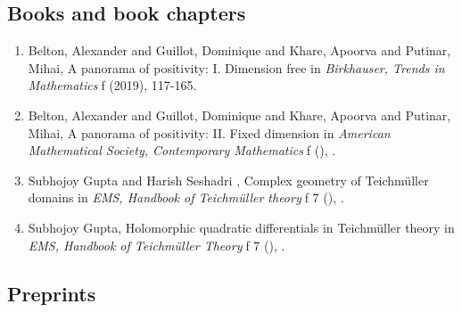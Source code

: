 \subsection{Books and book chapters}

\begin{enumerate}
\item Belton, Alexander and Guillot, Dominique and Khare, Apoorva and Putinar, Mihai, A panorama of positivity: I. Dimension free in {\em Birkhauser, Trends in Mathematics}{f } (2019), 117-165.
\item Belton, Alexander and Guillot, Dominique and Khare, Apoorva and Putinar, Mihai, A panorama of positivity: II. Fixed dimension in {\em American Mathematical Society, Contemporary Mathematics}{f } (), .
\item Subhojoy Gupta and Harish Seshadri , Complex geometry of Teichmüller domains in {\em EMS, Handbook of Teichmüller theory}{f 7} (), .
\item Subhojoy Gupta, Holomorphic quadratic differentials in Teichmüller theory in {\em EMS, Handbook of Teichmüller Theory}{f 7} (), .
\end{enumerate}

\subsection{Preprints}

